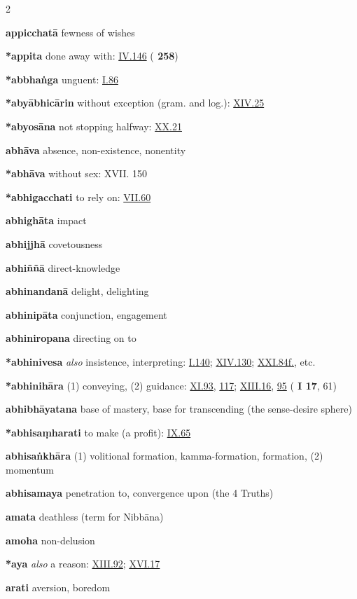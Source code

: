 \begin{multicols}{2}
\begin{vismHanging}
\par\textbf{appicchatā} fewness of wishes
\par\textbf{*appita} done away with: \hyperlink{IV.146}{IV.146}{} (\textbf{\cite{Vibh} 258}) 
\par\textbf{*abbhaṅga} unguent: \hyperlink{I.86}{I.86}{} 
\par\textbf{*abyābhicārin} without exception (gram. and log.): \hyperlink{XIV.25}{XIV.25}{} 
\par\textbf{*abyosāna} not stopping halfway: \hyperlink{XX.21}{XX.21}{}
\par\textbf{abhāva} absence, non-existence, nonentity 
\par\textbf{*abhāva} without sex: XVII. 150 
\par\textbf{*abhigacchati} to rely on: \hyperlink{VII.60}{VII.60}{} 
\par\textbf{abhighāta} impact
\par\textbf{abhijjhā} covetousness
\par\textbf{abhiññā} direct-knowledge
\par\textbf{abhinandanā} delight, delighting
\par\textbf{abhinipāta} conjunction, engagement
\par\textbf{abhiniropana} directing on to
\par\textbf{*abhinivesa} \emph{also }insistence, interpreting: \hyperlink{I.140}{I.140}{}; \hyperlink{XIV.130}{XIV.130}{}; \hyperlink{XXI.84}{XXI.84f.}{}, etc. 
\par\textbf{*abhinihāra} (1) conveying, (2) guidance: \hyperlink{XI.93}{XI.93}{}, \hyperlink{XI.117}{117}{}; \hyperlink{XIII.16}{XIII.16}{}, \hyperlink{XIII.95}{95}{} (\textbf{\cite{Paṭis} I 17}, 61)
\par\textbf{abhibhāyatana} base of mastery, base for transcending (the sense-desire sphere)
\par\textbf{*abhisaṃharati} to make (a profit): \hyperlink{IX.65}{IX.65}{}
\par\textbf{abhisaṅkhāra} (1) volitional formation, kamma-formation, formation, (2) momentum 
\par\textbf{abhisamaya} penetration to, convergence upon (the 4 Truths) 
\par\textbf{amata} deathless (term for Nibbāna)
\par\textbf{amoha} non-delusion 
\par\textbf{*aya} \emph{also }a reason: \hyperlink{XIII.92}{XIII.92}{}; \hyperlink{XVI.17}{XVI.17}{}
\par\textbf{arati} aversion, boredom

\end{vismHanging}
\end{multicols}
